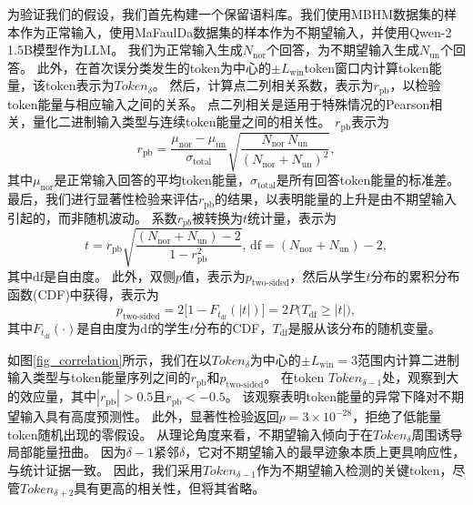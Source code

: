 \documentclass[UTF8,lettersize,journal]{IEEEtran}
\begin{document}
为验证我们的假设，我们首先构建一个保留语料库。我们使用MBHM数据集\cite{Peng_Liu_Du_Gao_Wang_2025}的样本作为正常输入，使用MaFaulDa数据集\cite{MaFaulDa_dataset}的样本作为不期望输入，并使用Qwen-2 1.5B模型\cite{QWEN}作为LLM。
我们为正常输入生成$N_\mathrm{nor}$个回答，为不期望输入生成$N_\mathrm{un}$个回答。
此外，在首次误分类发生的token为中心的$\pm L_{\mathrm{win}}$token窗口内计算token能量，该token表示为$\mathit{Token}_{{\delta}}$。
然后，计算点二列相关系数，表示为$r_\mathrm{pb}$，以检验token能量与相应输入之间的关系。
点二列相关是适用于特殊情况的Pearson相关，量化二进制输入类型与连续token能量之间的相关性。
$r_\mathrm{pb}$表示为
\begin{equation}
	r_\mathrm{{pb}}=
	\frac{\mu_\mathrm{nor} - \mu_\mathrm{un}}{\sigma_\mathrm{total}}
	\sqrt{\frac{N_\mathrm{nor}\,N_\mathrm{un}}{(N_\mathrm{nor}+N_\mathrm{un})^2}},
\end{equation}
其中$\mu_\mathrm{nor}$是正常输入回答的平均token能量，$\sigma_\mathrm{total}$是所有回答token能量的标准差。
最后，我们进行显著性检验来评估$r_\mathrm{pb}$的结果，以表明能量的上升是由不期望输入引起的，而非随机波动。
系数$r_{pb}$被转换为$t$统计量，表示为
\begin{equation}
	t=r_\mathrm{pb}\sqrt{\frac{(N_\mathrm{nor}+N_\mathrm{un}) - 2}{1 - r_\mathrm{pb}^2}},\,\mathrm{df} = (N_\mathrm{nor}+N_\mathrm{un}) - 2, 
\end{equation}
其中$\mathrm{df}$是自由度。
此外，双侧$p$值，表示为$p_{\text{two-sided}}$，然后从学生$t$分布的累积分布函数(CDF)中获得，表示为
\begin{equation}
	p_{\text{two-sided}} = 2\bigl[1-F_{t_{\mathrm{df}}}(|t|)\bigr]
	= 2P\bigl(T_{\mathrm{df}}\ge |t|\bigr),
	\label{eq:p_value}
\end{equation}
其中$F_{t_{\mathrm{df}}}(\cdot)$是自由度为$\mathrm{df}$的学生$t$分布的CDF，$T_{\mathrm{df}}$是服从该分布的随机变量。


如图\ref{fig_correlation}所示，我们在以$\mathit{Token}_{\delta}$为中心的$\pm L_{\mathrm{win}}=3$范围内计算二进制输入类型与token能量序列之间的$r_{\mathrm{pb}}$和$p_{\text{two-sided}}$。
在token $\mathit{Token}_{\delta-1}$处，观察到大的效应量，其中$|r_{\mathrm{pb}}| > 0.5$且$r_{\mathrm{pb}} < -0.5$。
该观察表明token能量的异常下降对不期望输入具有高度预测性。
此外，显著性检验返回$p=3\times10^{-28}$，拒绝了低能量token随机出现的零假设。
从理论角度来看，不期望输入倾向于在$\mathit{Token}_{\delta}$周围诱导局部能量扭曲。
因为${\delta}-1$紧邻${\delta}$，它对不期望输入的最早迹象本质上更具响应性，与统计证据一致。
因此，我们采用$\mathit{Token}_{\delta-1}$作为不期望输入检测的关键token，尽管$\mathit{Token}_{\delta+2}$具有更高的相关性，但将其省略。
\end{document}
